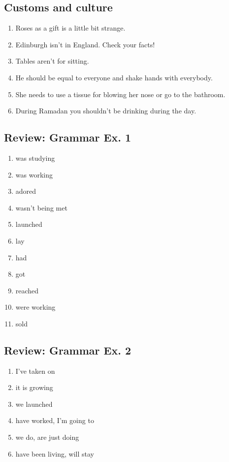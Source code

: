 \documentclass[12pt, a4paper, oneside]{article}
\begin{document}
  \subsection{Customs and culture}
  \begin{enumerate}[1.]
    \item Roses as a gift is a little bit strange.
    \item Edinburgh isn't in England. Check your facts!
    \item Tables aren't for sitting.
    \item He should be equal to everyone and shake hands with everybody.
    \item She needs to use a tissue for blowing her nose or go to the bathroom.
    \item During Ramadan you shouldn't be drinking during the day.
  \end{enumerate}

  \subsection{Review: Grammar Ex. 1}
  \begin{enumerate}[1.]
    \item was studying
    \item was working
    \item adored
    \item wasn't being met
    \item launched
    \item lay
    \item had
    \item got
    \item reached
    \item were working
    \item sold
  \end{enumerate}

  \subsection{Review: Grammar Ex. 2}
  \begin{enumerate}[1.]
    \item I've taken on
    \item it is growing
    \item we launched
    \item have worked, I'm going to
    \item we do, are just doing
    \item have been living, will stay
  \end{enumerate}
\end{document}
